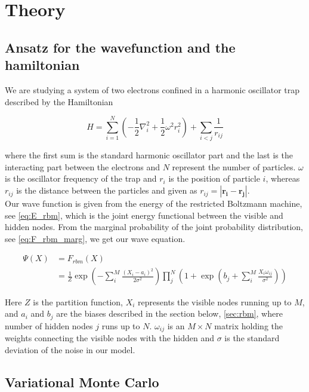 \section{Theory}

\subsection{Ansatz for the wavefunction and the hamiltonian}

We are studying a system of two electrons confined in a harmonic oscillator trap described by the Hamiltonian 

\begin{equation}\label{eq:Hamilt}
\hat{H} = \sum_{i=1}^N \left( - \frac{1}{2} \nabla_i^2 + \frac{1}{2} \omega^2 r_i^2 \right) + \sum_{i<j} \frac{1}{r_{ij}}
\end{equation}

where the first sum is the standard harmonic oscillator part and the last is the interacting part between the electrons and $N$ represent the number of particles. $\omega$ is the oscillator frequency of the trap and $r_i$ is the position of particle $i$, whereas $r_{ij}$ is the distance between the particles and given as $r_{ij} = |\mathbf{r_i} - \mathbf{r_j}|$. \\
Our wave function is given from the energy of the restricted Boltzmann machine, see \eqref{eq:E_rbm}, which is the joint energy functional between the visible and hidden nodes. From the marginal probability of the joint probability distribution, see \eqref{eq:F_rbm_marg}, we get our wave equation.                     

\begin{align}\label{eq:F_rbm}
\Psi(X) &= F_{rbm}(X) \\
&= \frac{1}{Z} \exp \left( -\sum_{i}^{M} \frac{(X_i - a_i)^2}{2 \sigma^2} \right) \prod_{j}^{N} \left( 1 + \exp \left( b_j + \sum_{i}^{M} \frac{X_i \omega_{ij}}{\sigma^2} \right) \right)
\end{align}

Here $Z$ is the partition function, $X_i$ represents the visible nodes running up to $M$, and $a_i$ and $b_j$ are the biases described in the section below, \eqref{sec:rbm}, where number of hidden nodes $j$ runs up to $N$. $\omega_{ij}$ is an $M \times N$ matrix holding the weights connecting the visible nodes with the hidden and $\sigma$ is the standard deviation of the noise in our model. \\ 

\subsection{Variational Monte Carlo}

